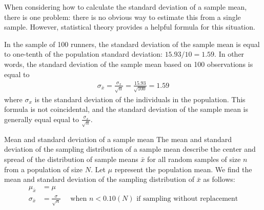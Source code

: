 \D{\newpage}


When considering how to calculate the standard deviation of a sample mean, there is one problem: there is no obvious way to estimate this from a single sample. However, statistical theory provides a helpful formula for this situation.  

In the sample of 100 runners, the standard deviation of the sample mean is equal to one-tenth of the population standard deviation: $15.93/10 = 1.59$. In other words, the standard deviation of the sample mean based on 100 observations is equal to
\begin{eqnarray*}
\sigma_{\bar{x}} = \frac{\sigma_{x}}{\sqrt{n}} = \frac{15.93}{\sqrt{100}} = 1.59
\end{eqnarray*}
where $\sigma_{x}$ is the standard deviation of the individuals in the population.  This formula is not coincidental, and the standard deviation of the sample mean is generally equal equal to $\frac{\sigma_{x}}{\sqrt{n}}$. 




\begin{onebox}{Mean and standard deviation of a sample mean}
The mean and standard deviation of the sampling distribution of a sample mean describe the center and spread of the distribution of sample means $\bar{x}$ for all random samples of size $n$ from a population of size $N$.  Let $\mu$ represent the population mean.  We find the mean and standard deviation of the sampling distribution of $\bar{x}$ as follows:  \vspace{-1mm}
\begin{align*}
\mu_{\bar{x}} &= \mu \\
 \sigma_{\bar{x}} &= \frac{\sigma}{\sqrt{n}} \quad \text{ when } n<0.10(N) \text{ if sampling without replacement}
\end{align*}
\end{onebox}

